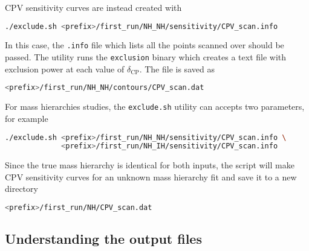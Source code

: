 \documentclass[a4paper, 11pt]{article}
\begin{document}
CPV sensitivity curves are instead created with
\begin{lstlisting}[language=bash]
	./exclude.sh <prefix>/first_run/NH_NH/sensitivity/CPV_scan.info
\end{lstlisting}
In this case, the \texttt{.info} file which lists all the points scanned over should be passed.
The utility runs the \texttt{exclusion} binary which creates a text file with exclusion power %
at each value of $\delta_\text{CP}$.
The file is saved as
\begin{lstlisting}[language=bash]
	<prefix>/first_run/NH_NH/contours/CPV_scan.dat
\end{lstlisting}

For mass hierarchies studies, the \texttt{exclude.sh} utility can accepts two parameters, for example
\begin{lstlisting}[language=bash]
	./exclude.sh <prefix>/first_run/NH_NH/sensitivity/CPV_scan.info \
		     <prefix>/first_run/NH_IH/sensitivity/CPV_scan.info
\end{lstlisting}
Since the true mass hierarchy is identical for both inputs, the script will make CPV sensitivity curves %
for an unknown mass hierarchy fit and save it to a new directory
\begin{lstlisting}[language=bash]
	<prefix>/first_run/NH/CPV_scan.dat
\end{lstlisting}

\subsection{Understanding the output files}
\end{document}
